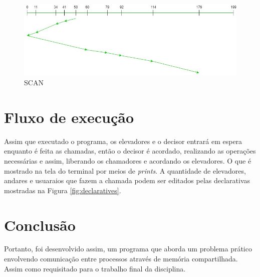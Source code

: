 \documentclass[a4paper,final,12pt]{article}
\begin{document}
\pagebreak

\begin{figure}[h!]
  \includegraphics[scale=0.5]{imgs/scan.jpg}
  \caption{SCAN}
  \label{fig:scan}
\end{figure}

\section{Fluxo de execução}\label{result}
Assim que executado o programa, os elevadores e o decisor entrará em espera enquanto é feita as chamadas, então o decisor é acordado, realizando as operações necessárias e assim, liberando os chamadores e acordando os elevadores. O que é mostrado na tela do terminal por meios de \textit{prints}. A quantidade de  elevadores, andares e usuaraios que fazem a chamada podem ser editados pelas declarativas mostradas na Figura \ref{fig:declaratives}.


\section{Conclusão}
Portanto, foi desenvolvido assim, um programa que aborda um problema prático envolvendo comunicação entre processos através de memória compartilhada. Assim como requisitado para o trabalho final da disciplina.

\printbibliography
\end{document}
